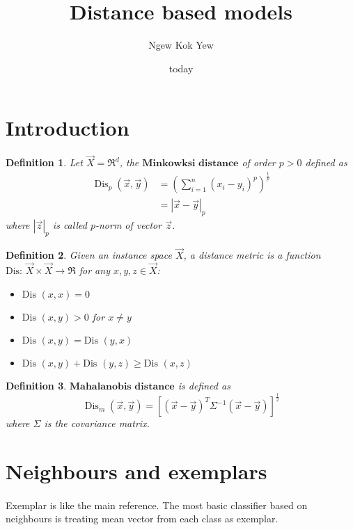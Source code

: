 \documentclass{article}
\title{Distance based models}
\author{Ngew Kok Yew}
\date{today}
\newtheorem{definition}{Definition}
\begin{document}
\maketitle
{}
\newpage
{}
\section{Introduction}
\begin{definition}
Let $\Vec{X} = \Re^d$, the $\textbf{Minkowksi distance}$ of order $p>0$ defined as 
\begin{align*}
    \operatorname{Dis}_{p} (\Vec{x}, \Vec{y}) &=
    (\displaystyle\sum_{i=1}^{n} (x_i - y_i)^p)^\frac{1}{p} \\
    &= |\Vec{x}-\Vec{y}|_p
\end{align*}
where $|\Vec{z}|_p$ is called $p$-norm of vector $\Vec{z}$.
\end{definition}

\begin{definition}
Given an instance space $\Vec{X}$, a distance metric is a function $\text{Dis: }\Vec{X} \times \Vec{X} \rightarrow \Re$ for any $x, y, z \in \Vec{X}$:
\begin{itemize}
    \item $\text{Dis }(x, x)=0$
    \item $\text{Dis }(x, y)>0$ for $x \neq y$
    \item $\text{Dis } (x, y) = \text{Dis } (y, x)$
    \item $\text{Dis } (x, y) + \text{Dis } (y, z) \geq \text{Dis } (x, z)$
\end{itemize}
\end{definition}

\begin{definition}
$\textbf{Mahalanobis distance}$ is defined as 
\begin{equation*}
    \operatorname{Dis}_{m} (\Vec{x}, \Vec{y}) = [(\Vec{x}-\Vec{y})^T\Sigma^{-1}(\Vec{x}-\Vec{y})]^\frac{1}{2}
\end{equation*}
where $\Sigma$ is the covariance matrix.
\end{definition}

\section{Neighbours and exemplars}
\paragraph{}
Exemplar is like the main reference. The most basic classifier based on neighbours is treating mean vector from each class as exemplar.
\end{document}
